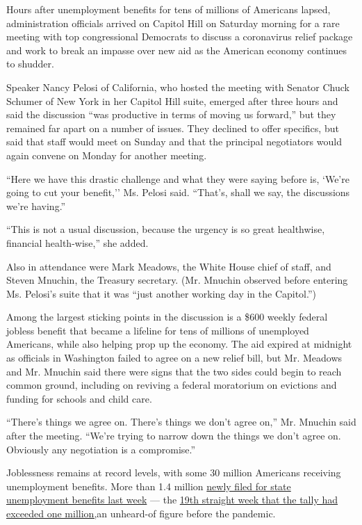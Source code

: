 Hours after unemployment benefits for tens of millions of Americans
lapsed, administration officials arrived on Capitol Hill on Saturday
morning for a rare meeting with top congressional Democrats to discuss a
coronavirus relief package and work to break an impasse over new aid as
the American economy continues to shudder.

Speaker Nancy Pelosi of California, who hosted the meeting with Senator
Chuck Schumer of New York in her Capitol Hill suite, emerged after three
hours and said the discussion ``was productive in terms of moving us
forward,'' but they remained far apart on a number of issues. They
declined to offer specifics, but said that staff would meet on Sunday
and that the principal negotiators would again convene on Monday for
another meeting.

``Here we have this drastic challenge and what they were saying before
is, `We're going to cut your benefit,'' Ms. Pelosi said. ``That's, shall
we say, the discussions we're having.''

``This is not a usual discussion, because the urgency is so great
healthwise, financial health-wise,'' she added.

Also in attendance were Mark Meadows, the White House chief of staff,
and Steven Mnuchin, the Treasury secretary. (Mr. Mnuchin observed before
entering Ms. Pelosi's suite that it was ``just another working day in
the Capitol.'')

Among the largest sticking points in the discussion is a \$600 weekly
federal jobless benefit that became a lifeline for tens of millions of
unemployed Americans, while also helping prop up the economy. The aid
expired at midnight as officials in Washington failed to agree on a new
relief bill, but Mr. Meadows and Mr. Mnuchin said there were signs that
the two sides could begin to reach common ground, including on reviving
a federal moratorium on evictions and funding for schools and child
care.

``There's things we agree on. There's things we don't agree on,'' Mr.
Mnuchin said after the meeting. ``We're trying to narrow down the things
we don't agree on. Obviously any negotiation is a compromise.''

Joblessness remains at record levels, with some 30 million Americans
receiving unemployment benefits. More than 1.4 million
\href{https://oui.doleta.gov/press/2020/073020.pdf}{newly filed for
state unemployment benefits last week} --- the
\href{https://www.nytimes3xbfgragh.onion/2020/07/30/business/economy/q2-gdp-coronavirus-economy.html}{19th
straight week that the tally had exceeded one million,}an unheard-of
figure before the pandemic.

